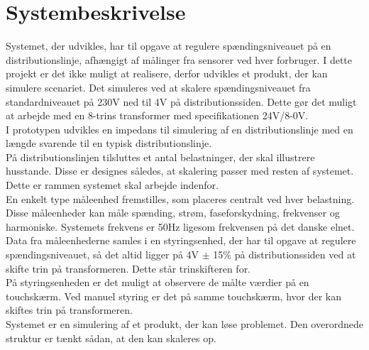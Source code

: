 
\section{Systembeskrivelse}

Systemet, der udvikles, har til opgave at regulere spændingsniveauet på en distributionslinje, afhængigt af målinger fra sensorer ved hver forbruger.
I dette projekt er det ikke muligt at realisere, derfor udvikles et produkt, der kan simulere scenariet. Det simuleres ved at skalere spændingsniveauet fra standardniveauet på 230V ned til 4V på distributionssiden. Dette gør det muligt at arbejde med en 8-trins transformer med specifikationen 24V/8-0V.\\
I prototypen udvikles en impedans til simulering af en distributionslinje med en længde svarende til en typisk distributionslinje.\\
På distributionslinjen tilsluttes et antal belastninger, der skal illustrere husstande. Disse er designes således, at skalering passer med resten af systemet. Dette er rammen systemet skal arbejde indenfor. \\
En enkelt type måleenhed fremstilles, som placeres centralt ved hver belastning. Disse måleenheder kan måle spænding, strøm, faseforskydning, frekvenser og harmoniske.  Systemets frekvens er 50Hz ligesom frekvensen på det danske elnet.\\
Data fra måleenhederne samles i en styringsenhed, der har til opgave at regulere spændingsniveauet, så det altid ligger på 4V $\pm$ 15$\%$ på distributionssiden ved at skifte trin på transformeren. Dette står trinskifteren for.\\
På styringsenheden er det muligt at observere de målte værdier på en touchskærm. Ved manuel styring er det på samme touchskærm, hvor der kan skiftes trin på transformeren.\\
Systemet er en simulering af et produkt, der kan løse problemet. Den overordnede struktur er tænkt sådan, at den kan skaleres op.\\

